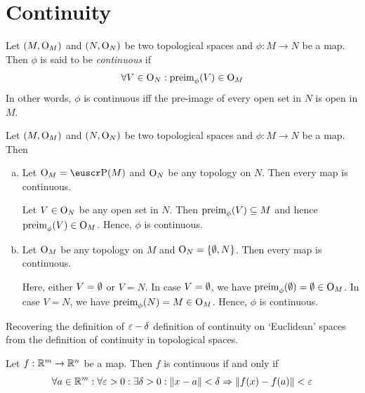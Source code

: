 \section{Continuity}

\begin{definition}[Continuity]
	Let \((M, \mathrm{O}_M)\) and \((N, \mathrm{O}_N)\) be two topological spaces and \(\phi: M \to N\) be a map. Then \(\phi\) is said to be \emph{continuous} if
	\begin{equation}
		\forall V \in \mathrm{O}_N: \operatorname{preim}_{\phi}(V) \in \mathrm{O}_M \label{eq:continuity}
	\end{equation}
	In other words, \(\phi\) is continuous iff the pre-image of every open set in \(N\) is open in \(M\).
\end{definition}

\begin{example}
	Let \((M, \mathrm{O}_M)\) and \((N, \mathrm{O}_N)\) be two topological spaces and \(\phi: M \to N\) be a map. Then
	\begin{enumerate}[(a)]
		\item Let \(\O_M = \powerset(M)\) and \(\mathrm{O}_N\) be any topology on \(N\). Then every map is continuous.

		      Let \(V \in \mathrm{O}_N\) be any open set in \(N\). Then \(\operatorname{preim}_{\phi}(V) \subseteq M\) and hence \(\operatorname{preim}_{\phi}(V) \in \mathrm{O}_M\). Hence, \(\phi\) is continuous.

		\item Let \(\mathrm{O}_M\) be any topology on \(M\) and \(\mathrm{O}_N = \qty{\emptyset, N}\). Then every map is continuous.

		      Here, either \(V = \emptyset\) or \(V = N\). In case \(V = \emptyset\), we have \(\operatorname{preim}_{\phi}(\emptyset) = \emptyset \in \mathrm{O}_M\). In case \(V = N\), we have \(\operatorname{preim}_{\phi}(N) = M \in \mathrm{O}_M\). Hence, \(\phi\) is continuous.
	\end{enumerate}
\end{example}

Recovering the definition of \(\varepsilon-\delta\) definition of continuity on `Euclidean' spaces from the definition of continuity in topological spaces.
\begin{theorem}
	Let \(f: \mathbb R^m \to \mathbb R^n\) be a map. Then \(f\) is continuous if and only if
	\begin{equation}
		\forall a \in \mathbb R^m: \forall \varepsilon > 0: \exists \delta > 0: \norm{x - a} < \delta \Rightarrow \norm{f(x) - f(a)} < \varepsilon \label{eq:continuity_Rm_Rn}
	\end{equation}
\end{theorem}

